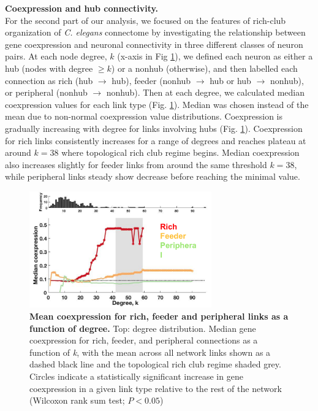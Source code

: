 \documentclass[10pt,letterpaper]{article}
\begin{document}
\textbf{Coexpression and hub connectivity.}\\
For the second part of our analysis, we focused on the features of rich-club organization of \textit{C. elegans} connectome by investigating the relationship between gene coexpression and neuronal connectivity in three different classes of neuron pairs.
At each node degree, $k$ (x-axis in Fig \ref{RCdegree}), we defined each neuron as either a hub (nodes with degree $\geq k$) or a nonhub (otherwise), and then labelled each connection as rich (hub $\rightarrow$ hub), feeder (nonhub $\rightarrow$ hub or hub $\rightarrow$ nonhub), or peripheral (nonhub $\rightarrow$ nonhub). 
Then at each degree, we calculated median coexpression values for each link type (Fig. \ref{RCdegree}). 
Median was chosen instead of the mean due to non-normal coexpression value distributions.
Coexpression is gradually increasing with degree for links involving hubs (Fig. \ref{RCdegree}). 
Coexpression for rich links consistently increases for a range of degrees and reaches plateau at around $k=38$ where topological rich club regime begins. 
Median coexpression also increases slightly for feeder links from around the same threshold $k=38$, while peripheral links steady show decrease before reaching the minimal value.

 \begin{figure}[!h]
 \centering
    \includegraphics[width=0.7\textwidth]{RichFeederPeripheral_k}
 \caption{{\bf Mean coexpression for rich, feeder and peripheral links as a function of degree.}
Top: degree distribution. Median gene coexpression for rich, feeder, and peripheral connections as a function of \textit{k}, with the mean across all network links shown as a dashed black line and the topological rich club regime shaded grey. 
Circles indicate a statistically significant increase in gene coexpression in a given link type relative to the rest of the network (Wilcoxon rank sum test; $P < 0.05$)}
 \label{RCdegree}
 \end{figure}
\end{document}
